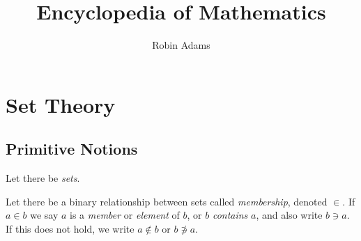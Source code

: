 \documentclass{book}
\title{Encyclopedia of Mathematics}
\author{Robin Adams}
\begin{document}
    \maketitle
    \tableofcontents

    \chapter{Set Theory}

    \section{Primitive Notions}

    Let there be \emph{sets}.

    Let there be a binary relationship between sets called \emph{membership}, denoted $\in$. If $a \in b$ we say $a$ is a \emph{member} or \emph{element} of $b$, or $b$ \emph{contains} $a$, and also write $b \ni a$. If this does not hold, we write $a \notin b$ or $b \not\ni a$.
\end{document}
